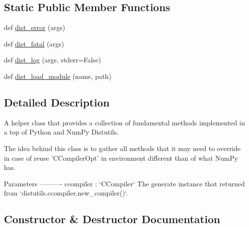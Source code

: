 \subsection*{Static Public Member Functions}
\begin{DoxyCompactItemize}
\item 
def \hyperlink{classnumpy_1_1distutils_1_1ccompiler__opt_1_1__Distutils_a84f787a5483eead1f66201c2ab293ebe}{dist\+\_\+error} (args)
\item 
def \hyperlink{classnumpy_1_1distutils_1_1ccompiler__opt_1_1__Distutils_a4f0c1e246b59e90a295ffc422bd2bd3e}{dist\+\_\+fatal} (args)
\item 
def \hyperlink{classnumpy_1_1distutils_1_1ccompiler__opt_1_1__Distutils_af73467a9b36866d0311004df5dcd3ffa}{dist\+\_\+log} (args, stderr=False)
\item 
def \hyperlink{classnumpy_1_1distutils_1_1ccompiler__opt_1_1__Distutils_a5460fdb52867389a9b385f538755bda9}{dist\+\_\+load\+\_\+module} (name, path)
\end{DoxyCompactItemize}


\subsection{Detailed Description}
\begin{DoxyVerb}A helper class that provides a collection of fundamental methods
implemented in a top of Python and NumPy Distutils.

The idea behind this class is to gather all methods that it may
need to override in case of reuse 'CCompilerOpt' in environment
different than of what NumPy has.

Parameters
----------
ccompiler : `CCompiler`
    The generate instance that returned from `distutils.ccompiler.new_compiler()`.
\end{DoxyVerb}
 

\subsection{Constructor \& Destructor Documentation}
\mbox{\label{classnumpy_1_1distutils_1_1ccompiler__opt_1_1__Distutils_a442a62571b2a4907088bdb127195fccb}} 
